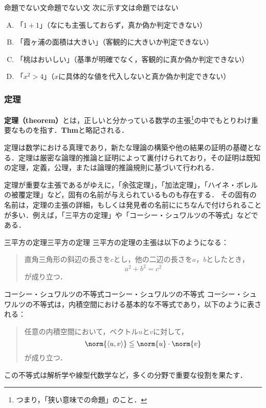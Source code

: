 \documentclass[a4paper,11pt]{ltjsarticle}
\renewcommand{\emph}[1]{\textbf{#1}}
\renewcommand{\leq}{\leqq}
\begin{document}
\begin{example}{命題でない文}{命題でない文}
    次に示す文は命題ではない
    \begin{enumerate}[(A)]
    \item 「$1+1$」（なにも主張しておらず，真か偽か判定できない）
    \item 「霞ヶ浦の面積は大きい」（客観的に大きいか判定できない）
    \item 「桃はおいしい」（基準が明確でなく，客観的に真か偽か判定できない）
    \item 「$x^2 > 4$」（$x$に具体的な値を代入しないと真か偽か判定できない）
    \end{enumerate}
\end{example}

\subsubsection{定理}

\emph{定理（theorem）}とは，正しいと分かっている数学の主張\footnote{つまり，「狭い意味での命題」のこと．}の中でもとりわけ重要なものを指す．\textbf{Thm}と略記される．


定理は数学における真理であり，新たな理論の構築や他の結果の証明の基礎となる．定理は厳密な論理的推論と証明によって裏付けられており，その証明は既知の定理，定義，公理，または論理的推論規則に基づいて行われる．

定理が重要な主張であるがゆえに，「余弦定理」，「加法定理」，「ハイネ・ボレルの被覆定理」など，固有の名前が与えられているものも存在する．
その固有の名前は，定理の主張の詳細，もしくは発見者の名前ににちなんで付けられることが多い．例えば，「三平方の定理」や「コーシー・シュワルツの不等式」などである．

\begin{example}{三平方の定理}{三平方の定理}
	三平方の定理の主張は以下のようになる：
	\begin{quotation}
    直角三角形の斜辺の長さを$c$とし，他の二辺の長さを$a$，$b$としたとき，
    \[
        a^2+b^2=c^2
    \]
    が成り立つ．
\end{quotation}
\end{example}
  
  \begin{example}{コーシー・シュワルツの不等式}{コーシー・シュワルツの不等式}
  コーシー・シュワルツの不等式は，内積空間における基本的な不等式であり，以下のように表される：
  \begin{quotation}
  任意の内積空間において，ベクトル$u$と$v$に対して，
  \[
  \norm{\langle u, v \rangle} \leq \norm{u} \cdot \norm{v}
  \]
  が成り立つ．
  \end{quotation}
  この不等式は解析学や線型代数学など，多くの分野で重要な役割を果たす．
  \end{example}
  
\end{document}
